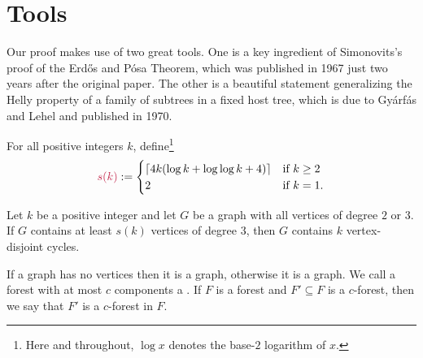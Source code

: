 \documentclass{patmorin}
\newcommand{\gwen}[1]{\textcolor{Purple}{Gwen: #1}}
\begin{document}
\section{Tools}

Our proof makes use of two great tools. 
One is a key ingredient of Simonovits's~\cite{Simonovits67} proof of the Erdős and Pósa Theorem, which was published in 1967 just two years after the original paper. 
The other is a beautiful statement generalizing the Helly property of a family of subtrees in a fixed host tree, which is due to Gyárfás and Lehel and published in 1970.


For all positive integers $k$, define\footnote{Here and throughout, $\log x$ denotes the base-$2$ logarithm of $x$.}
\[
\mathdefin{s(k)}:=\begin{cases}
\lceil 4k(\log k + \log\log k +4)\rceil&\textrm{if $k\geq2$}\\
2&\textrm{if $k=1$.}
\end{cases}
\]

\begin{thm}
\label{thm:simonovits}
Let $k$ be a positive integer and
let $G$ be a graph with all vertices of degree $2$ or $3$.
If $G$ contains at least $s(k)$ vertices of degree $3$, then
$G$ contains $k$ vertex-disjoint cycles.
\end{thm}

If a graph has no vertices then it is a  graph, otherwise it is a  graph. 
We call a forest with at most $c$ components a . If $F$ is a forest and $F'\subseteq F$ is a $c$-forest, then we say that $F'$ is a $c$-forest  in $F$.


\end{document}

